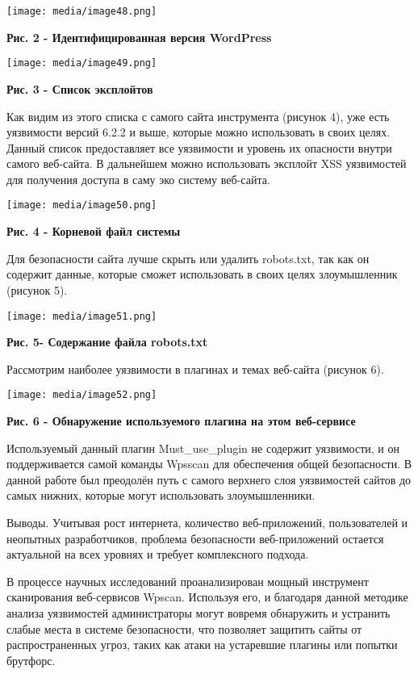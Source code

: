 \documentclass[
]{article}
\begin{document}
\texttt{[image: media/image48.png]}

\textbf{Рис. 2 - Идентифицированная версия WordPress}

\texttt{[image: media/image49.png]}

\textbf{Рис. 3 - Список эксплойтов}

Как видим из этого списка с самого сайта инструмента (рисунок 4), уже
есть уязвимости версий 6.2.2 и выше, которые можно использовать в своих
целях. Данный список предоставляет все уязвимости и уровень их опасности
внутри самого веб-сайта. В дальнейшем можно использовать эксплойт XSS
уязвимостей для получения доступа в саму эко систему веб-сайта.

\texttt{[image: media/image50.png]}

\textbf{Рис. 4 - Корневой файл системы}

Для безопасности сайта лучше скрыть или удалить robots.txt, так как он
содержит данные, которые сможет использовать в своих целях злоумышленник
(рисунок 5).

\texttt{[image: media/image51.png]}

\textbf{Рис. 5- Содержание файла robots.txt}

Рассмотрим наиболее уязвимости в плагинах и темах веб-сайта (рисунок 6).

\texttt{[image: media/image52.png]}

\textbf{Рис. 6 - Обнаружение используемого плагина на этом веб-сервисе}

Используемый данный плагин Must\_use\_plugin не содержит уязвимости, и
он поддерживается самой команды Wpsscan для обеспечения общей
безопасности. В данной работе был преодолён путь с самого верхнего слоя
уязвимостей сайтов до самых нижних, которые могут использовать
злоумышленники.

Выводы. Учитывая рост интернета, количество веб-приложений,
пользователей и неопытных разработчиков, проблема безопасности
веб-приложений остается актуальной на всех уровнях и требует
комплексного подхода.

В процессе научных исследований проанализирован мощный инструмент
сканирования веб-сервисов Wpscan. Используя его, и благодаря данной
методике анализа уязвимостей администраторы могут вовремя обнаружить и
устранить слабые места в системе безопасности, что позволяет защитить
сайты от распространенных угроз, таких как атаки на устаревшие плагины
или попытки брутфорс.
\end{document}
